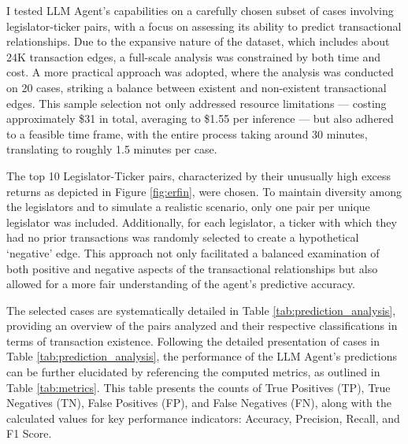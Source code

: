 \documentclass[15pt,letterpaper]{article}
\begin{document}
I tested LLM Agent's capabilities on a carefully chosen subset of cases involving legislator-ticker pairs, 
with a focus on assessing its ability to predict transactional relationships. 
Due to the expansive nature of the dataset, which includes about 24K transaction edges, 
a full-scale analysis was constrained by both time and cost. A more practical approach was adopted, where the analysis was conducted on 20 cases, 
striking a balance between existent and non-existent transactional edges. This sample selection not only addressed resource limitations — costing approximately \$31 in total, averaging to \$1.55 per inference 
— but also adhered to a feasible time frame, with the entire process taking around 30 minutes, 
translating to roughly 1.5 minutes per case.

The top 10 Legislator-Ticker 
pairs, characterized by their 
unusually high excess returns as depicted in Figure \ref{fig:erfin}, were chosen. 
To maintain diversity among the legislators and to simulate a realistic scenario, only one pair per unique legislator was included. Additionally, for each legislator, a ticker with which they had no prior transactions was randomly selected to create a hypothetical `negative' edge. 
This approach not only facilitated a balanced examination of both positive and negative aspects of the transactional relationships but also allowed for a more fair understanding of the agent's predictive accuracy.

The selected cases are systematically detailed in Table \ref{tab:prediction_analysis}, 
providing an overview of the pairs analyzed and their respective classifications in terms of transaction existence. 
Following the detailed presentation of cases in Table \ref{tab:prediction_analysis}, the performance of the LLM Agent's predictions can be further elucidated by referencing the computed metrics, as outlined in Table \ref{tab:metrics}. 
This table presents the counts of True Positives (TP), True Negatives (TN), False Positives (FP), and False Negatives (FN), along with the calculated values for key performance indicators: Accuracy, Precision, Recall, and F1 Score.
\end{document}
